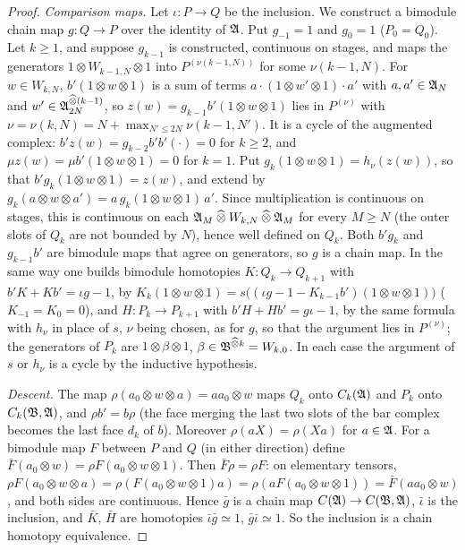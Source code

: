 \begin{proof}
\emph{Comparison maps.} Let \(\iota:P\to Q\) be the inclusion. We
construct a bimodule chain map \(g:Q\to P\) over the identity of \(\mathfrak A\).
Put \(g_{-1}=1\) and \(g_0=1\) (\(P_0=Q_0\)). Let \(k\ge1\), and suppose
\(g_{k-1}\) is constructed, continuous on stages, and maps the
generators \(1\otimes W_{k-1,N}\otimes1\) into \(P^{(\nu(k-1,N))}\) for
some \(\nu(k-1,N)\). For \(w\in W_{k,N}\), \(b'(1\otimes w\otimes1)\) is a
sum of terms \(a\cdot(1\otimes w'\otimes1)\cdot a'\) with \(a,a'\in\mathfrak A_N\)
and \(w'\in\mathfrak A_{2N}^{\mathbin{\widehat\otimes}(k-1)}\), so \(z(w)=g_{k-1}b'(1\otimes
w\otimes1)\) lies in \(P^{(\nu)}\) with
\(\nu=\nu(k,N)=N+\max_{N'\le2N}\nu(k-1,N')\). It is a cycle of the
augmented complex: \(b'z(w)=g_{k-2}b'b'(\cdot)=0\) for \(k\ge2\), and
\(\mu z(w)=\mu b'(1\otimes w\otimes1)=0\) for \(k=1\). Put
\(g_k(1\otimes w\otimes1)=h_\nu(z(w))\), so that
\(b'g_k(1\otimes w\otimes1)=z(w)\), and extend by
\(g_k(a\otimes w\otimes a')=a\,g_k(1\otimes w\otimes1)\,a'\). Since
multiplication is continuous on stages, this is continuous on each
\(\mathfrak A_M\mathbin{\widehat\otimes} W_{k,N}\mathbin{\widehat\otimes}\mathfrak A_M\) for every \(M\ge N\) (the outer slots of
\(Q_k\) are not bounded by \(N\)), hence well defined on \(Q_k\). Both
\(b'g_k\) and \(g_{k-1}b'\) are bimodule maps that agree on generators,
so \(g\) is a chain map. In the same way one builds bimodule homotopies
\(K:Q_k\to Q_{k+1}\) with \(b'K+Kb'=\iota g-1\), by
\(K_k(1\otimes w\otimes1)=s\bigl((\iota g-1-K_{k-1}b')(1\otimes
w\otimes1)\bigr)\) (\(K_{-1}=K_0=0\)), and \(H:P_k\to P_{k+1}\) with
\(b'H+Hb'=g\iota-1\), by the same formula with \(h_\nu\) in place of
\(s\), \(\nu\) being chosen, as for \(g\), so that the argument lies in
\(P^{(\nu)}\); the generators of \(P_k\) are \(1\otimes\beta\otimes1\),
\(\beta\in\mathfrak B^{\mathbin{\widehat\otimes} k}=W_{k,0}\). In each case the argument of
\(s\) or \(h_\nu\) is a cycle by the inductive hypothesis.

\emph{Descent.} The map \(\rho(a_0\otimes w\otimes a)=aa_0\otimes w\)
maps \(Q_k\) onto \(C_k(\mathfrak A)\) and \(P_k\) onto \(C_k(\mathfrak B,\mathfrak A)\),
and \(\rho b'=b\rho\) (the face merging the last two slots of the bar
complex becomes the last face \(d_k\) of \(b\)). Moreover
\(\rho(aX)=\rho(Xa)\) for \(a\in\mathfrak A\). For a bimodule map \(F\) between
\(P\) and \(Q\) (in either direction) define \(\bar F(a_0\otimes w)=
\rho F(a_0\otimes w\otimes1)\). Then \(\bar F\rho=\rho F\): on elementary
tensors, \(\rho F(a_0\otimes w\otimes a)=\rho(F(a_0\otimes w\otimes1)a)
=\rho(aF(a_0\otimes w\otimes1))=\bar F(aa_0\otimes w)\), and both sides
are continuous. Hence \(\bar g\) is a chain map \(C(\mathfrak A)\to
C(\mathfrak B,\mathfrak A)\), \(\bar\iota\) is the inclusion, and \(\bar K\),
\(\bar H\) are homotopies \(\bar\iota\bar g\simeq1\),
\(\bar g\bar\iota\simeq1\). So the inclusion is a chain homotopy
equivalence.
\end{proof}

